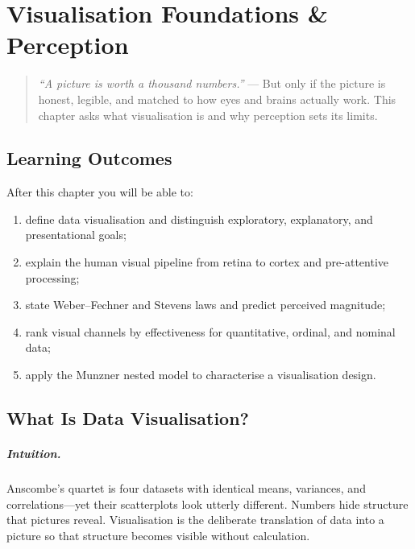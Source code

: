 \chapter{Visualisation Foundations \& Perception}
\label{ch:foundations}
\sloppy

\begin{quote}
\emph{``A picture is worth a thousand numbers.''} --- But only if the picture is honest, legible, and matched to how eyes and brains actually work. This chapter asks what visualisation is and why perception sets its limits.
\end{quote}

\noindent{}
\vspace{0.4em}

\section*{Learning Outcomes}
After this chapter you will be able to:
\begin{enumerate}[label=(L\arabic*)]
    \item define data visualisation and distinguish exploratory, explanatory, and presentational goals;
    \item explain the human visual pipeline from retina to cortex and pre-attentive processing;
    \item state Weber--Fechner and Stevens laws and predict perceived magnitude;
    \item rank visual channels by effectiveness for quantitative, ordinal, and nominal data;
    \item apply the Munzner nested model to characterise a visualisation design.
\end{enumerate}

\section{What Is Data Visualisation?}
\label{sec:what-is-vis}
\paragraph{Intuition.} Anscombe's quartet is four datasets with identical means, variances, and correlations---yet their scatterplots look utterly different. Numbers hide structure that pictures reveal. Visualisation is the deliberate translation of data into a picture so that structure becomes visible without calculation.

